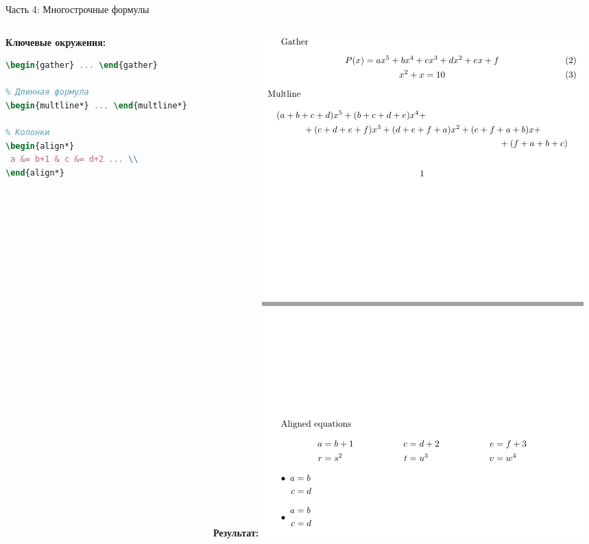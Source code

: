 \documentclass[aspectratio=169]{beamer}
\begin{document}
\begin{frame}[fragile]{Часть 4: Многострочные формулы}
    \begin{columns}[T]
        \begin{column}{0.45\textwidth}
            \textbf{Ключевые окружения:}
            \begin{lstlisting}[language=tex]
% Группировка
\begin{gather} ... \end{gather}

% Длинная формула
\begin{multline*} ... \end{multline*}

% Колонки
\begin{align*}
 a &= b+1 & c &= d+2 ... \\
\end{align*}
            \end{lstlisting}
        \end{column}
        \begin{column}{0.55\textwidth}
            \textbf{Результат:}
            \includegraphics[width=\textwidth, height=0.7\textheight, keepaspectratio]{image/4.png}
        \end{column}
    \end{columns}
\end{frame}
\end{document}
